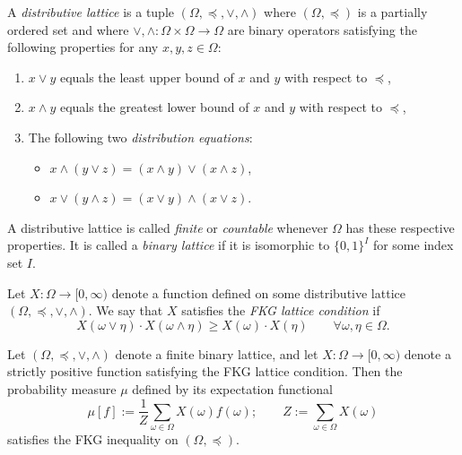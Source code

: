 \begin{definition}
    A \emph{distributive lattice} is a tuple $(\Omega,\preceq,\vee,\wedge)$
    where $(\Omega,\preceq)$ is a partially ordered set
    and where $\vee,\wedge:\Omega\times\Omega\to\Omega$
    are binary operators satisfying the following properties
    for any $x,y,z\in\Omega$:
    \begin{enumerate}
        \item $x\vee y$ equals the least upper bound of $x$ and $y$ with respect to $\preceq$,
        \item $x\wedge y$ equals the greatest lower bound of $x$ and $y$ with respect to $\preceq$,
        \item The following two \emph{distribution equations}:
        \begin{itemize}
            \item $x\wedge (y\vee z)=(x\wedge y)\vee(x\wedge z)$,
            \item $x\vee (y\wedge z)=(x\vee y)\wedge(x\vee z)$.
        \end{itemize}
    \end{enumerate}
    A distributive lattice is called \emph{finite} or \emph{countable}
    whenever $\Omega$ has these respective properties.
    It is called a \emph{binary lattice} if it is isomorphic
    to $\{0,1\}^I$ for some index set $I$.
\end{definition}


\begin{definition}
    Let $X:\Omega\to[0,\infty)$ denote a
    function defined on some distributive lattice $(\Omega,\preceq,\vee,\wedge)$.
    We say that $X$ satisfies the \emph{FKG lattice condition}
    if 
    \begin{equation}
        X(\omega\vee\eta)\cdot X(\omega\wedge\eta)
        \geq
        X(\omega)\cdot X(\eta)
        \qquad
        \forall\omega,\eta\in\Omega.
    \end{equation}
\end{definition}

\begin{theorem}[FKG, 1971]
    \label{thm:original_FKG}
    Let $(\Omega,\preceq,\vee,\wedge)$ denote a finite binary lattice,
    and let $X:\Omega\to[0,\infty)$ denote a strictly positive function
    satisfying the FKG lattice condition.
    Then the probability measure $\mu$ defined by its expectation functional
    \[
        \mu[f]:=\frac1Z\sum_{\omega\in\Omega}X(\omega)f(\omega);
        \qquad Z:=\sum_{\omega\in\Omega}X(\omega)
    \]
    satisfies the FKG inequality on $(\Omega,\preceq)$.
\end{theorem}

